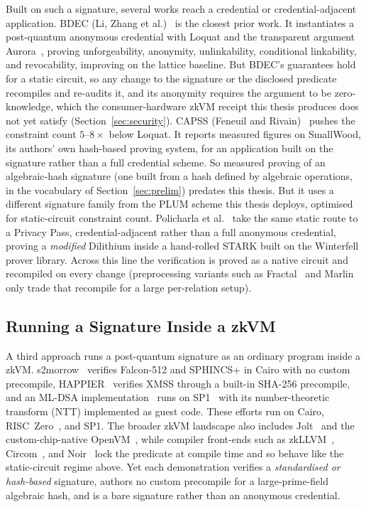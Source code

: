 Built on such a signature, several works reach a credential or credential-adjacent application. BDEC (Li, Zhang et al.)~\cite{10.1007/978-981-96-0957-4_3} is the closest prior work. It instantiates a post-quantum anonymous credential with Loquat and the transparent argument Aurora~\cite{cryptoeprint:2018/828}, proving unforgeability, anonymity, unlinkability, conditional linkability, and revocability, improving on the lattice baseline. But BDEC's guarantees hold for a static circuit, so any change to the signature or the disclosed predicate recompiles and re-audits it, and its anonymity requires the argument to be zero-knowledge, which the consumer-hardware zkVM receipt this thesis produces does not yet satisfy (Section~\ref{sec:security}). CAPSS (Feneuil and Rivain)~\cite{feneuil2025capss} pushes the constraint count $5$--$8\times$ below Loquat. It reports measured figures on SmallWood, its authors' own hash-based proving system, for an application built on the signature rather than a full credential scheme. So measured proving of an algebraic-hash signature (one built from a hash defined by algebraic operations, in the vocabulary of Section~\ref{sec:prelim}) predates this thesis. But it uses a different signature family from the PLUM scheme this thesis deploys, optimised for static-circuit constraint count. Policharla et al.~\cite{policharla2023pqprivacypass} take the same static route to a Privacy Pass, credential-adjacent rather than a full anonymous credential, proving a \emph{modified} Dilithium inside a hand-rolled STARK built on the Winterfell prover library. Across this line the verification is proved as a native circuit and recompiled on every change (preprocessing variants such as Fractal~\cite{cryptoeprint:2019/1076} and Marlin~\cite{chiesa2020marlin} only trade that recompile for a large per-relation setup).

\subsection{Running a Signature Inside a zkVM}
A third approach runs a post-quantum signature as an ordinary program inside a zkVM. s2morrow~\cite{s2morrow2025} verifies Falcon-512 and SPHINCS+ in Cairo with no custom precompile, HAPPIER~\cite{saygan2026happier} verifies XMSS through a built-in SHA-256 precompile, and an ML-DSA implementation~\cite{kota2025dilithiumzk} runs on SP1~\cite{succinct2024sp1} with its number-theoretic transform (NTT) implemented as guest code. These efforts run on Cairo, RISC~Zero~\cite{bruestle2023risczero}, and SP1. The broader zkVM landscape also includes Jolt~\cite{cryptoeprint:2023/1217} and the custom-chip-native OpenVM~\cite{openvm2025}, while compiler front-ends such as zkLLVM~\cite{Kaskov2024zkLLVM}, Circom~\cite{10002421}, and Noir~\cite{noir_lang} lock the predicate at compile time and so behave like the static-circuit regime above. Yet each demonstration verifies a \emph{standardised or hash-based} signature, authors no custom precompile for a large-prime-field algebraic hash, and is a bare signature rather than an anonymous credential.

